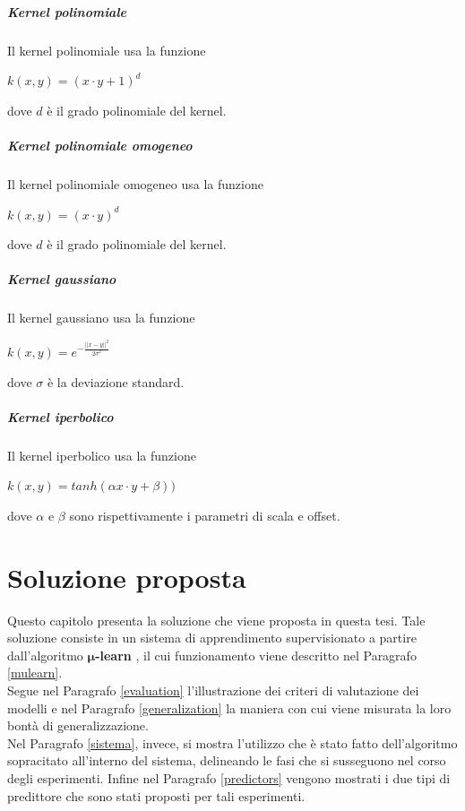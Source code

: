 \documentclass[12pt]{report}
\theoremstyle{definition}
\begin{document}
\paragraph{Kernel polinomiale}
Il kernel polinomiale usa la funzione
\begin{center}
    $k(x,y) = (x \cdot y + 1)^d$
\end{center}
dove $d$ è il grado polinomiale del kernel.

\paragraph{Kernel polinomiale omogeneo}
Il kernel polinomiale omogeneo usa la funzione
\begin{center}
    $k(x,y) = (x \cdot y)^d$
\end{center}
dove $d$ è il grado polinomiale del kernel.

\paragraph{Kernel gaussiano}
Il kernel gaussiano usa la funzione
\begin{center}
    $k(x,y) = e^{-\frac{||x-y||^2}{2\sigma^2}}$
\end{center}
dove $\sigma$ è la deviazione standard.

\paragraph{Kernel iperbolico}
Il kernel iperbolico usa la funzione
\begin{center}
    $k(x,y) = tanh(\alpha x \cdot y + \beta))$
\end{center}
dove $\alpha$ e $\beta$ sono rispettivamente i parametri di scala e offset.

\chapter{Soluzione proposta}
\label{Capitolo 2}
\onehalfspacing
Questo capitolo presenta la soluzione che viene proposta in questa tesi.
Tale soluzione consiste in un sistema di apprendimento supervisionato a partire dall'algoritmo $\bm{\mu}$\textbf{-learn} \cite{1}, il cui funzionamento viene descritto nel Paragrafo \ref{mulearn}.
\\
Segue nel Paragrafo \ref{evaluation} l'illustrazione dei criteri di valutazione dei modelli e nel Paragrafo \ref{generalization} la maniera con cui viene misurata la loro bontà di generalizzazione.
\\
Nel Paragrafo \ref{sistema}, invece, si mostra l'utilizzo che è stato fatto dell'algoritmo sopracitato all'interno del sistema, delineando le fasi che si susseguono nel corso degli esperimenti. Infine nel Paragrafo \ref{predictors} vengono mostrati i due tipi di predittore che sono stati proposti per tali esperimenti.
\end{document}
